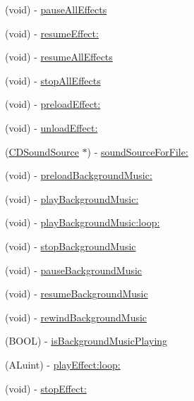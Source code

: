 \begin{DoxyCompactItemize}
(void) -\/ \hyperlink{interfaceSimpleAudioEngine_a50ce3f003c8028e4e2c23e36db89d362}{pause\+All\+Effects}
\item 
(void) -\/ \hyperlink{interfaceSimpleAudioEngine_a3d8cc5eee577353bfd9daa51bbee376d}{resume\+Effect\+:}
\item 
(void) -\/ \hyperlink{interfaceSimpleAudioEngine_a502d7f9edde68126ebe1ecd9d29357e4}{resume\+All\+Effects}
\item 
(void) -\/ \hyperlink{interfaceSimpleAudioEngine_a41cac6b6201c29a06ce18e52191520de}{stop\+All\+Effects}
\item 
(void) -\/ \hyperlink{interfaceSimpleAudioEngine_a0f27d03cab04292f2dcbfc1ba8344e54}{preload\+Effect\+:}
\item 
(void) -\/ \hyperlink{interfaceSimpleAudioEngine_a1f3f121b3664c6b5bcfc33c8af63e52c}{unload\+Effect\+:}
\item 
(\hyperlink{interfaceCDSoundSource}{C\+D\+Sound\+Source} $\ast$) -\/ \hyperlink{interfaceSimpleAudioEngine_a8ab8450895ef35d23744db31e5826d01}{sound\+Source\+For\+File\+:}
\item 
(void) -\/ \hyperlink{interfaceSimpleAudioEngine_a289e2e89ab55d63a38792fd8f2e5b645}{preload\+Background\+Music\+:}
\item 
(void) -\/ \hyperlink{interfaceSimpleAudioEngine_ae48157a1dea7e96833cb705bd6cd6709}{play\+Background\+Music\+:}
\item 
(void) -\/ \hyperlink{interfaceSimpleAudioEngine_a57ba0d607696f7d86c66f03c321060ce}{play\+Background\+Music\+:loop\+:}
\item 
(void) -\/ \hyperlink{interfaceSimpleAudioEngine_a81e61f21116fc8d46b8242e9caa48006}{stop\+Background\+Music}
\item 
(void) -\/ \hyperlink{interfaceSimpleAudioEngine_addf0536bfbb9ad38668108ee289ccaf6}{pause\+Background\+Music}
\item 
(void) -\/ \hyperlink{interfaceSimpleAudioEngine_a565f2d3e28072b6a7173064b797767c0}{resume\+Background\+Music}
\item 
(void) -\/ \hyperlink{interfaceSimpleAudioEngine_ab91dfde414f3ef20ccd891e59ba5a67d}{rewind\+Background\+Music}
\item 
(B\+O\+OL) -\/ \hyperlink{interfaceSimpleAudioEngine_a973125b75501bf21ae82f30ab1aea87c}{is\+Background\+Music\+Playing}
\item 
(A\+Luint) -\/ \hyperlink{interfaceSimpleAudioEngine_ac5a5f080f92f05ff681973c3e83c1156}{play\+Effect\+:loop\+:}
\item 
(void) -\/ \hyperlink{interfaceSimpleAudioEngine_a4d818613fe0acb6fa8dc9fac400327f0}{stop\+Effect\+:}

\end{DoxyCompactItemize}

